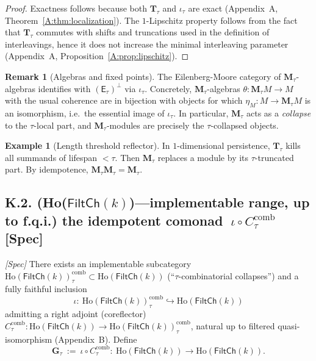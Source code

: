 \documentclass[11pt]{article}
\numberwithin{equation}{section}
\theoremstyle{plain}
\theoremstyle{definition}
\theoremstyle{remark}
\DeclareRobustCommand{\hyp}{\nobreakdash-}
\newcommand{\Ho}{\mathrm{Ho}}
\theoremstyle{plain}
\theoremstyle{definition}
\numberwithin{equation}{section}
\theoremstyle{definition}
\newtheorem{example}[theorem]{Example}
\newtheorem{remark}[theorem]{Remark}
\numberwithin{equation}{section}
\theoremstyle{plain}
\theoremstyle{definition}
\theoremstyle{remark}
\begin{document}
\begin{proof}
Exactness follows because both \(\mathbf{T}_\tau\) and \(\iota_\tau\) are exact (Appendix~A, Theorem~\ref{A:thm:localization}). The \(1\)\hyp Lipschitz property follows from the fact that \(\mathbf{T}_\tau\) commutes with shifts and truncations used in the definition of interleavings, hence it does not increase the minimal interleaving parameter (Appendix~A, Proposition~\ref{A:prop:lipschitz}).
\end{proof}

\begin{remark}[Algebras and fixed points]\label{K:rk:algebras}
The Eilenberg\hyp Moore category of \(\mathbf{M}_\tau\)\hyp algebras identifies with \((\mathsf{E}_\tau)^\perp\) via \(\iota_\tau\). Concretely, \(\mathbf{M}_\tau\)\hyp algebras \(\theta:\mathbf{M}_\tau M \to M\) with the usual coherence are in bijection with objects for which \(\eta_M:M\to \mathbf{M}_\tau M\) is an isomorphism, i.e.\ the essential image of \(\iota_\tau\). In particular, \(\mathbf{M}_\tau\) acts as a \emph{collapse} to the \(\tau\)\hyp local part, and \(\mathbf{M}_\tau\)\hyp modules are precisely the \(\tau\)\hyp collapsed objects.
\end{remark}

\begin{example}[Length threshold reflector]
In \(1\)\hyp dimensional persistence, \(\mathbf{T}_\tau\) kills all summands of lifespan \(<\tau\). Then \(\mathbf{M}_\tau\) replaces a module by its \(\tau\)\hyp truncated part. By idempotence, \(\mathbf{M}_\tau\mathbf{M}_\tau=\mathbf{M}_\tau\).
\end{example}

\subsection*{K.2. (Ho(\(\mathsf{FiltCh}(k)\))—implementable range, up to f.q.i.) the idempotent comonad \(\ \iota\circ C_\tau^{\mathrm{comb}}\) [Spec]}
\emph{[Spec]} There exists an implementable subcategory \(\Ho(\mathsf{FiltCh}(k))_\tau^{\mathrm{comb}}\subset \Ho(\mathsf{FiltCh}(k))\) (``\(\tau\)\hyp combinatorial collapses'') and a fully faithful inclusion
\[
\iota:\ \Ho(\mathsf{FiltCh}(k))_\tau^{\mathrm{comb}}\hookrightarrow \Ho(\mathsf{FiltCh}(k))
\]
admitting a right adjoint (coreflector) \(C_\tau^{\mathrm{comb}}:\Ho(\mathsf{FiltCh}(k))\to \Ho(\mathsf{FiltCh}(k))_\tau^{\mathrm{comb}}\), natural up to filtered quasi\hyp isomorphism (Appendix~B). Define
\[
\mathbf{G}_\tau\ :=\ \iota\circ C_\tau^{\mathrm{comb}}:\ \Ho(\mathsf{FiltCh}(k))\longrightarrow \Ho(\mathsf{FiltCh}(k)).
\]
\end{document}
